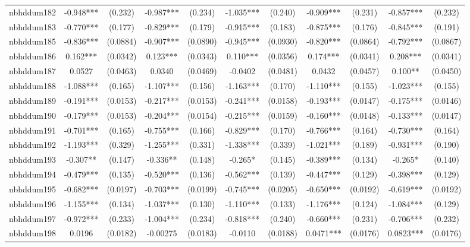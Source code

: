 \documentclass[]{article}
\begin{document}
\begin{tabular}{lcccccccccc}
nbhddum182 & -0.948*** & (0.232) & -0.987*** & (0.234) & -1.035*** & (0.240) & -0.909*** & (0.231) & -0.857*** & (0.232) \\
nbhddum183 & -0.770*** & (0.177) & -0.829*** & (0.179) & -0.915*** & (0.183) & -0.875*** & (0.176) & -0.845*** & (0.191) \\
nbhddum185 & -0.836*** & (0.0884) & -0.907*** & (0.0890) & -0.945*** & (0.0930) & -0.820*** & (0.0864) & -0.792*** & (0.0867) \\
nbhddum186 & 0.162*** & (0.0342) & 0.123*** & (0.0343) & 0.110*** & (0.0356) & 0.174*** & (0.0341) & 0.208*** & (0.0341) \\
nbhddum187 & 0.0527 & (0.0463) & 0.0340 & (0.0469) & -0.0402 & (0.0481) & 0.0432 & (0.0457) & 0.100** & (0.0450) \\
nbhddum188 & -1.088*** & (0.165) & -1.107*** & (0.156) & -1.163*** & (0.170) & -1.110*** & (0.155) & -1.023*** & (0.155) \\
nbhddum189 & -0.191*** & (0.0153) & -0.217*** & (0.0153) & -0.241*** & (0.0158) & -0.193*** & (0.0147) & -0.175*** & (0.0146) \\
nbhddum190 & -0.179*** & (0.0153) & -0.204*** & (0.0154) & -0.215*** & (0.0159) & -0.160*** & (0.0148) & -0.133*** & (0.0147) \\
nbhddum191 & -0.701*** & (0.165) & -0.755*** & (0.166) & -0.829*** & (0.170) & -0.766*** & (0.164) & -0.730*** & (0.164) \\
nbhddum192 & -1.193*** & (0.329) & -1.255*** & (0.331) & -1.338*** & (0.339) & -1.021*** & (0.189) & -0.931*** & (0.190) \\
nbhddum193 & -0.307** & (0.147) & -0.336** & (0.148) & -0.265* & (0.145) & -0.389*** & (0.134) & -0.265* & (0.140) \\
nbhddum194 & -0.479*** & (0.135) & -0.520*** & (0.136) & -0.562*** & (0.139) & -0.447*** & (0.129) & -0.398*** & (0.129) \\
nbhddum195 & -0.682*** & (0.0197) & -0.703*** & (0.0199) & -0.745*** & (0.0205) & -0.650*** & (0.0192) & -0.619*** & (0.0192) \\
nbhddum196 & -1.155*** & (0.134) & -1.037*** & (0.130) & -1.110*** & (0.133) & -1.176*** & (0.124) & -1.084*** & (0.129) \\
nbhddum197 & -0.972*** & (0.233) & -1.004*** & (0.234) & -0.818*** & (0.240) & -0.660*** & (0.231) & -0.706*** & (0.232) \\
nbhddum198 & 0.0196 & (0.0182) & -0.00275 & (0.0183) & -0.0110 & (0.0188) & 0.0471*** & (0.0176) & 0.0823*** & (0.0176) \\

\end{tabular}
\end{document}
